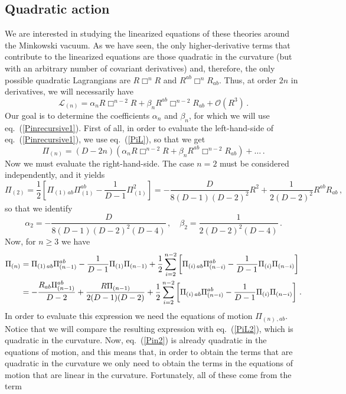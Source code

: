 \documentclass[11pt]{article}
\newcommand{\req}[1]{(\ref{#1})} %
\renewcommand{\req}[1]{eq.~(\ref{#1})}
\begin{document}
{\subsection{Quadratic action}
We are interested in studying the linearized equations of these theories around the Minkowski vacuum. As we have seen, the only higher-derivative terms that contribute to the linearized equations are those quadratic in the curvature (but with an arbitrary number of covariant derivatives) and, therefore, the only possible quadratic Lagrangians are $R\Box^{n} R$ and $R^{ab}\Box^n R_{ab}$.  Thus, at order $2n$ in derivatives, we will necessarily have
\begin{equation}\label{Ln}
\mathcal{L}_{(n)}=\alpha_{n} R\Box^{n-2} R+\beta_{n}R^{ab}\Box^{n-2}R_{ab}+\mathcal{O}(R^3)\, .
\end{equation} 
Our goal is to determine the coefficients $\alpha_{n}$ and $\beta_{n}$, for which we will use \req{Pinrecursive1}. First of all, in order to evaluate the left-hand-side of \req{Pinrecursive1}, we use \req{PiL}, so that we get
\begin{equation}\label{PiL2}
\Pi_{(n)}=(D-2n)\left(\alpha_{n} R\Box^{n-2} R+\beta_{n}R^{ab}\Box^{n-2}R_{ab}\right)+\ldots\, .
\end{equation}
Now we must evaluate the right-hand-side. The case $n=2$ must be considered independently, and it yields
\begin{equation}
\Pi_{(2)}=\frac{1}{2}\left[\Pi_{(1)\, ab}\Pi^{ab}_{(1)}-\frac{1}{D-1}\Pi_{(1)}^2\right]=-\frac{D}{8(D-1)(D-2)^2}R^2+\frac{1}{2(D-2)^2}R^{ab}R_{ab}\, ,
\end{equation}
so that we identify
\begin{equation}
\alpha_{2}=-\frac{D}{8(D-1)(D-2)^2(D-4)}\, ,\quad \beta_{2}=\frac{1}{2(D-2)^2(D-4)}\, .
\end{equation}
Now, for $n\ge 3$ we have
\begin{align}\notag
\Pi_{(n)}&=\Pi_{(1)\, ab}\Pi^{ab}_{(n-1)}-\frac{1}{D-1}\Pi_{(1)}\Pi_{(n-1)}+\frac{1}{2}\sum_{i=2}^{n-2}\left[\Pi_{(i)\, ab}\Pi^{ab}_{(n-i)}-\frac{1}{D-1}\Pi_{(i)}\Pi_{(n-i)}\right]\\
&=-\frac{R_{ab}\Pi^{ab}_{(n-1)}}{D-2}+\frac{R\Pi_{(n-1)}}{2(D-1)(D-2)}+\frac{1}{2}\sum_{i=2}^{n-2}\left[\Pi_{(i)\, ab}\Pi^{ab}_{(n-i)}-\frac{1}{D-1}\Pi_{(i)}\Pi_{(n-i)}\right] \, .\label{Pin2}
\end{align}
In order to evaluate this expression we need the equations of motion $\Pi_{(n)\, ,ab}$. Notice that we will compare the resulting expression with \req{PiL2}, which is quadratic in the curvature. Now, \req{Pin2} is already quadratic in the equations of motion, and this means that, in order to obtain the terms that are quadratic in the curvature we only need to obtain the terms in the equations of motion that are linear in the curvature. Fortunately, all of these come from the term
}
\end{document}
